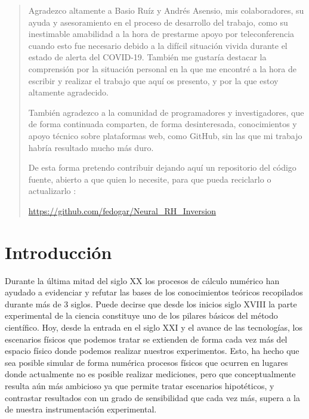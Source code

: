 \documentclass[8pt]{article}
\begin{document}
	\begin{abstract}
		
		Agradezco altamente a Basio Ruíz y Andrés Asensio, mis colaboradores, su ayuda y asesoramiento en el proceso de desarrollo del trabajo, como su inestimable amabilidad a la hora de prestarme apoyo por teleconferencia cuando esto fue necesario debido a la difícil situación vivida durante el estado de alerta del COVID-19. También me gustaría destacar la comprensión por la situación personal en la que me encontré a la hora de escribir y realizar el trabajo que aquí os presento, y por la que estoy altamente agradecido.	\newline
		
		También agradezco a la comunidad de programadores y investigadores, que de forma continuada comparten, de forma desinteresada, conocimientos y apoyo técnico sobre plataformas web, como GitHub, sin las que mi trabajo habría resultado mucho más duro.\newline
		
		De esta forma pretendo contribuir dejando aquí un repositorio del código fuente, abierto a que quien lo necesite, para que pueda reciclarlo o actualizarlo :\newline
		
		\url{https://github.com/fedogar/Neural_RH_Inversion}
		
	\end{abstract}\newpage
	

	\section{Introducción}

	Durante la última mitad del siglo XX los procesos de cálculo numérico han ayudado a evidenciar y refutar las bases de los conocimientos teóricos recopilados durante más de 3 siglos. Puede decirse que desde los inicios siglo XVIII la parte experimental de la ciencia constituye uno de los pilares básicos del método científico. Hoy, desde la entrada en el siglo XXI y el avance de las tecnologías, los escenarios físicos que podemos tratar se extienden de forma cada vez más del espacio físico donde podemos realizar nuestros experimentos. Esto, ha hecho que sea posible simular de forma numérica procesos físicos que ocurren en lugares donde actualmente no es posible realizar mediciones, pero que conceptualmente resulta aún más ambicioso ya que permite tratar escenarios hipotéticos, y contrastar resultados con un grado de sensibilidad que cada vez más, supera a la de nuestra instrumentación experimental.\newline
				
\end{document}
